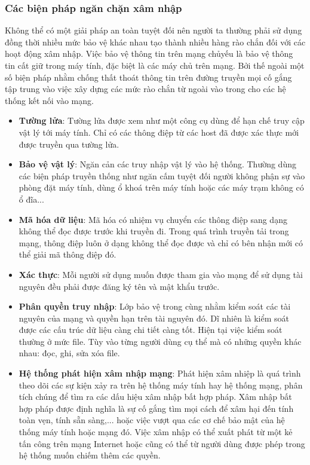 \subsubsection*{Các biện pháp ngăn chặn xâm nhập}
Không thể có một giải pháp an toàn tuyệt đối nên người ta thường phải sử dụng đồng thời nhiều mức bảo vệ khác nhau tạo thành nhiều hàng rào chắn đối với các hoạt động xâm nhập. Việc bảo vệ thông tin trên mạng chủyếu là bảo vệ thông tin cất giữ trong máy tính, đặc biệt là các máy chủ trên mạng. Bởi thế ngoài một số biện pháp nhằm chống thất thoát thông tin trên đường truyền mọi cố gắng tập trung vào việc xây dựng các mức rào chắn từ ngoài vào trong cho các hệ thống kết nối vào mạng. 
\begin{itemize}
    \item \textbf{Tường lửa}: Tường lửa được xem như một công cụ dùng để hạn chế truy cập vật lý tới máy tính. Chỉ có các thông điệp từ các host đã được xác thực mới được truyền qua tường lửa.
    \item \textbf{Bảo vệ vật lý}:  Ngăn cản các truy nhập vật lý vào hệ thống. Thường dùng các biện pháp truyền thống như ngăn cấm tuyệt đối người không phận sự vào phòng đặt máy tính, dùng ổ khoá trên máy tính hoặc các máy trạm không có ổ đĩa...  
    \item \textbf{Mã hóa dữ liệu}: Mã hóa có nhiệm vụ chuyển các thông điệp sang dạng không thể đọc được trước khi truyền đi. Trong quá trình truyền tải trong mạng, thông điệp luôn ở dạng không thể đọc được và chỉ có bên nhận mới có thể giải mã thông điệp đó.
    \item \textbf{Xác thực}: Mỗi người sử dụng muốn được tham gia vào mạng để sử dụng tài nguyên
đều phải được đăng ký tên và mật khẩu trước.
    \item \textbf{Phân quyền truy nhập}: Lớp bảo vệ trong cùng nhằm kiểm soát các tài nguyên của mạng và quyền hạn trên tài nguyên đó. Dĩ nhiên là kiểm soát được các cấu trúc dữ liệu càng chi tiết càng tốt. Hiện tại việc kiểm soát thường ở mức file. Tùy vào từng người dùng cụ thể mà có những quyền khác nhau: đọc, ghi, sửa xóa file.
    \item \textbf{Hệ thống phát hiện xâm nhập mạng}: Phát hiện xâm nhiệp là quá trình theo dõi các sự kiện xảy ra trên hệ thống máy tính hay hệ thống mạng, phân tích chúng để tìm ra các dấu hiệu xâm nhập bất hợp pháp. Xâm nhập bất hợp pháp được định nghĩa là sự cố gắng tìm mọi cách để xâm hại đến tính toàn vẹn, tính sẵn sàng,... hoặc việc vượt qua các cơ chế bảo mật của hệ thống máy tính hoặc mạng đó. Việc xâm nhập có thể xuất phát từ một kẻ tấn công trên mạng Internet hoặc cũng có thể từ người dùng được phép trong hệ thống muốn chiếm thêm các quyền.
\end{itemize}
